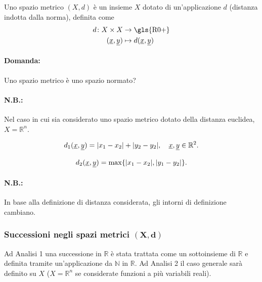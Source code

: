 \begin{definition}
    Uno spazio metrico $(X,d)$ è un insieme $X$ dotato di un'applicazione $d$ (distanza indotta dalla norma), definita come
    \begin{equation*}
        \begin{aligned}
            d\colon X\times X&\rightarrow\text{\gls{R0+}}\\
            (\uline x,\uline y)&\mapsto d(\uline x,\uline y)
        \end{aligned}
    \end{equation*}
\end{definition}

\paragraph{Domanda:} Uno spazio metrico è uno spazio normato?

\paragraph{N.B.:} Nel caso in cui sia considerato uno spazio metrico dotato della distanza euclidea, $X=\mathbb R^n$.

\begin{definition}
    \begin{equation*}
        d_1(\uline x,\uline y)=|x_1-x_2|+|y_2-y_2|,\quad\uline x,\uline y\in\mathbb R^2.
    \end{equation*}
\end{definition}

\begin{definition}
    \begin{equation*}
        d_2(\uline x,\uline y)=\max\{|x_1-x_2|,|y_1-y_2|\}.
    \end{equation*}
\end{definition}

\paragraph{N.B.:} In base alla definizione di distanza considerata, gli intorni di definizione cambiano.

\subsubsection{Successioni negli spazi metrici \texorpdfstring{$\boldsymbol{(X,d)}$}{(X,d)}}
Ad Analisi 1 una successione in $\mathbb R$ è stata trattata come un sottoinsieme di $\mathbb R$ e definita tramite un'applicazione da $\mathbb N$ in $\mathbb R$. Ad Analisi 2 il caso generale sarà definito su $X$ ($X=\mathbb R^n$ se considerate funzioni a più variabili reali).

